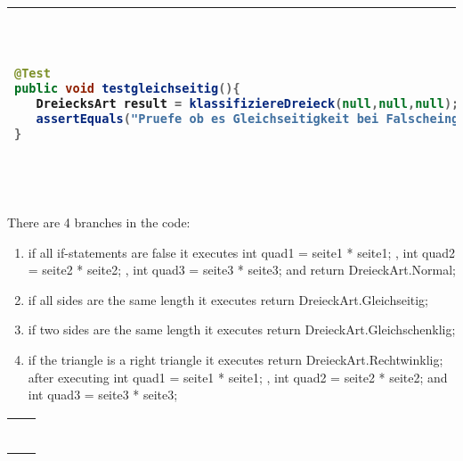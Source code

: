 \begin{parlist}
\begin{center}
\begin{longtable}[c]{ | p{12cm} | p{4cm} | }
\begin{lstlisting}[language=java,frame=trBL]
@Test
public void testgleichseitig(){
   DreiecksArt result = klassifiziereDreieck(null,null,null);
   assertEquals("Pruefe ob es Gleichseitigkeit bei Falscheingabe erkennt", DriecksArt.Normal, result);
}
  \end{lstlisting} & Need to check if it will recognize equallateral triangles even if it has bad input. \\
\hline
\end{longtable}

\end{center}

\item There are 4 branches in the code:
\begin{enumerate}
\item if all if-statements are false it executes int quad1 = seite1 * seite1; , int quad2 = seite2 * seite2; , int quad3 = seite3 * seite3; and return DreieckArt.Normal; 

\item if all sides are the same length it executes return DreieckArt.Gleichseitig;

\item if two sides are the same length it executes return DreieckArt.Gleichschenklig;
\item if the triangle is a right triangle it executes return DreieckArt.Rechtwinklig; after executing int quad1 = seite1 * seite1; , int quad2 = seite2 * seite2; and int quad3 = seite3 * seite3;
\end{enumerate}

\begin{center}
\begin{makebox}[\linewidth]

\begin{longtable}[c]{ | p{12cm} | p{4cm} | }
  \hline
  \begin{lstlisting}[language=java,frame=trBL]


\end{lstlisting}
\end{longtable}
\end{makebox}
\end{center}
\end{parlist}
